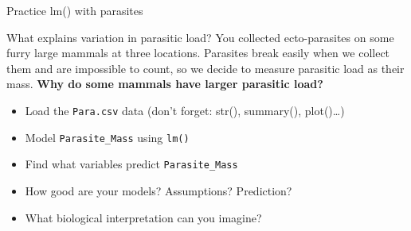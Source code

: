 \documentclass[10pt]{beamer}\usepackage[]{graphicx}\usepackage[]{color}
\begin{document}
\begin{frame}[fragile]{Practice lm() with parasites}


  
  \begin{alertblock}{What explains variation in parasitic load?}
  You collected ecto-parasites on some furry large mammals at three locations. Parasites break easily when we collect them and are impossible to count, so we decide to measure parasitic load as their mass. \textbf{Why do some mammals have larger parasitic load?} \pause
    \begin{itemize}
      \item Load the \texttt{Para.csv} data (don't forget: str(), summary(), plot()\dots)
      \item Model \verb+Parasite_Mass+ using \texttt{lm()}
      \item Find what variables predict \verb+Parasite_Mass+
      \item How good are your models? Assumptions? Prediction?
      \item What biological interpretation can you imagine?
      \end{itemize}
  \end{alertblock}
  
\end{frame}
\end{document}
